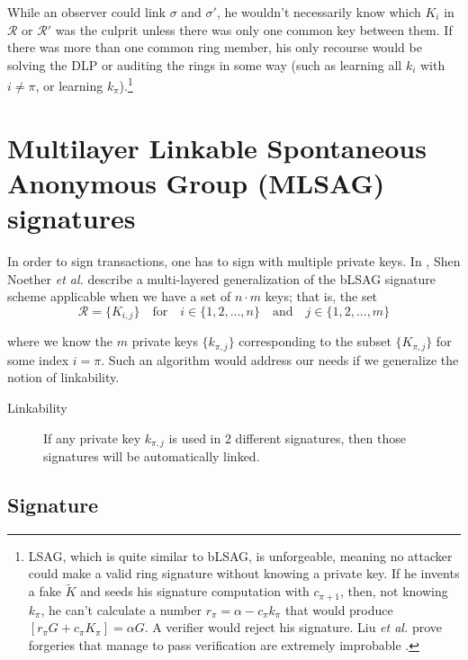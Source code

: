 While an observer could link $\sigma$ and $\sigma'$, he wouldn’t necessarily know which $K_i$ in $\mathcal{R}$ or $\mathcal{R}'$ was the culprit unless there was only one common key between them. If there was more than one common ring member, his only recourse would be solving the DLP or auditing the rings in some way (such as learning all $k_i$ with $i \neq \pi$, or learning $k_\pi$).\footnote{\label{lsag_unforgeable_note}LSAG, which is quite similar to bLSAG, is unforgeable, meaning no attacker could make a valid ring signature without knowing a private key. If he invents a fake $\tilde{K}$ and seeds his signature computation with $c_{\pi+1}$, then, not knowing $k_\pi$, he can’t calculate a number $r_\pi = \alpha - c_\pi k_\pi$ that would produce $[r_\pi G + c_\pi K_\pi] = \alpha G$. A verifier would reject his signature. Liu {\em et al.} prove forgeries that manage to pass verification are extremely improbable \cite{Liu2004}.}



\section{Multilayer Linkable Spontaneous Anonymous Group (MLSAG) signatures}
\label{sec:MLSAG}

In order to sign transactions, one has to sign with multiple private keys. In \cite{MRL-0005-ringct}, Shen Noether {\em et al.} describe a multi-layered generalization of the bLSAG signature scheme applicable when we have a set of \(n \cdot m\) keys; that is, the set\vspace{.175cm}
\[\mathcal{R} = \{K_{i,j}\}  \quad \textrm{for} \quad  i \in \{1, 2, ..., n\} \quad \textrm{and} \quad j \in \{1, 2, ..., m\}\]

where we know the $m$ private keys \(\{k_{\pi, j}\}\) corresponding to the subset \(\{K_{\pi, j}\}\) for some index \(i = \pi\). Such an algorithm would address our needs if we generalize the notion of linkability.
\begin{description}
	\item[Linkability] If any private key \(k_{\pi, j}\) is used in 2 different signatures, then those signatures will be automatically linked.
\end{description}


\subsection*{Signature}

